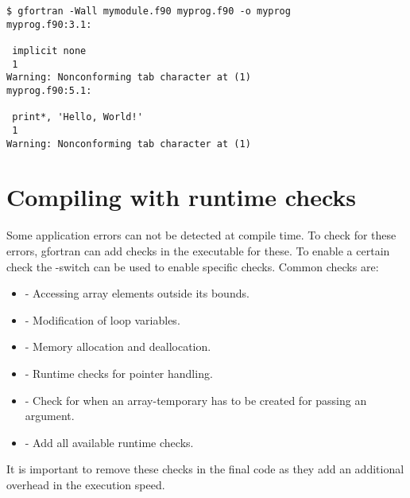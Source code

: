 \begin{lstlisting}
$ gfortran -Wall mymodule.f90 myprog.f90 -o myprog
myprog.f90:3.1:

 implicit none
 1
Warning: Nonconforming tab character at (1)
myprog.f90:5.1:

 print*, 'Hello, World!'
 1
Warning: Nonconforming tab character at (1)
\end{lstlisting}

\section{Compiling with runtime checks}

Some application errors can not be detected at compile time. To check for these errors, gfortran can add checks in the executable for these. To enable a certain check the -switch can be used to enable specific checks.  Common checks are:

\begin{itemize}
\item {} - Accessing array elements outside its bounds.
\item {} - Modification of loop variables.
\item {} - Memory allocation and deallocation.
\item {} - Runtime checks for pointer handling.
\item {} - Check for when an array-temporary has to be created for passing an argument.
\item {} - Add all available runtime checks.
\end{itemize}

It is important to remove these checks in the final code as they add an additional overhead in the execution speed.





